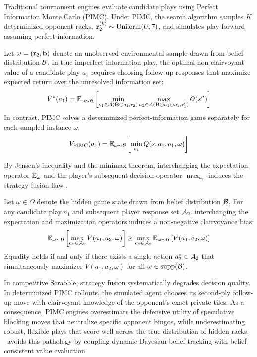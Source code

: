 Traditional tournament engines evaluate candidate plays using Perfect Information Monte Carlo (PIMC). Under PIMC, the search algorithm samples $K$ determinized opponent racks, $\mathbf{r}_2^{(k)} \sim \mathrm{Uniform}(U, 7)$, and simulates play forward assuming perfect information.

Let $\omega = (\mathbf{r}_2, \mathbf{b})$ denote an unobserved environmental sample drawn from belief distribution $\mathcal{B}$. In true imperfect-information play, the optimal non-clairvoyant value of a candidate play $a_1$ requires choosing follow-up responses that maximize expected return over the unresolved information set:
\begin{equation}
    \label{eq:true_iig_val}
    V^*(a_1) = \mathbb{E}_{\omega \sim \mathcal{B}} \left[ \min_{o_1 \in \mathcal{A}(\mathbf{B} \oplus a_1, \mathbf{r}_2)} \max_{a_2 \in \mathcal{A}(\mathbf{B} \oplus a_1 \oplus o_1, \mathbf{r}_1')} Q(s'') \right]
\end{equation}
In contrast, PIMC solves a determinized perfect-information game separately for each sampled instance $\omega$:
\begin{equation}
    \label{eq:pimc_val}
    V_{\mathrm{PIMC}}(a_1) = \mathbb{E}_{\omega \sim \mathcal{B}} \left[ \min_{o_1} Q(s, a_1, o_1, \omega) \right]
\end{equation}

By Jensen's inequality and the minimax theorem, interchanging the expectation operator $\mathbb{E}_\omega$ and the player's subsequent decision operator $\max_{a_2}$ induces the strategy fusion flaw \citep{sokota2026scalable}.

\begin{theorem}
\label{thm:fusion}
Let $\omega \in \Omega$ denote the hidden game state drawn from belief distribution $\mathcal{B}$. For any candidate play $a_1$ and subsequent player response set $\mathcal{A}_2$, interchanging the expectation and maximization operators induces a non-negative clairvoyance bias:
\begin{equation}
    \label{eq:strategy_fusion}
    \mathbb{E}_{\omega \sim \mathcal{B}} \left[ \max_{a_2 \in \mathcal{A}_2} V(a_1, a_2, \omega) \right] \ge \max_{a_2 \in \mathcal{A}_2} \mathbb{E}_{\omega \sim \mathcal{B}} \left[ V(a_1, a_2, \omega) \right]
\end{equation}
Equality holds if and only if there exists a single action $a_2^* \in \mathcal{A}_2$ that simultaneously maximizes $V(a_1, a_2, \omega)$ for all $\omega \in \mathrm{supp}(\mathcal{B})$.
\end{theorem}

In competitive Scrabble, strategy fusion systematically degrades decision quality. In determinized PIMC rollouts, the simulated agent chooses its second-ply follow-up move with clairvoyant knowledge of the opponent's exact private tiles. As a consequence, PIMC engines overestimate the defensive utility of speculative blocking moves that neutralize specific opponent bingos, while underestimating robust, flexible plays that score well across the true distribution of hidden racks. \algo\ avoids this pathology by coupling dynamic Bayesian belief tracking with belief-consistent value evaluation.
